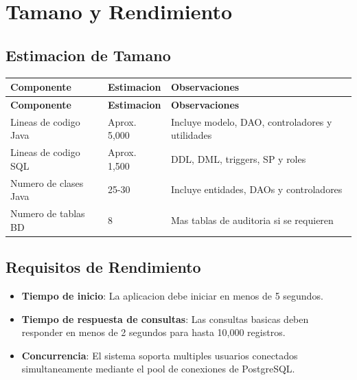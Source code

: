 \documentclass[12pt,a4paper]{article}
\begin{document}
\newpage
\section{Tamano y Rendimiento}

\subsection{Estimacion de Tamano}

\begin{longtable}{|p{5cm}|p{3cm}|p{6cm}|}
\hline
\rowcolor{udgreen!20}
\textbf{Componente} & \textbf{Estimacion} & \textbf{Observaciones} \\
\hline
\endfirsthead
\hline
\rowcolor{udgreen!20}
\textbf{Componente} & \textbf{Estimacion} & \textbf{Observaciones} \\
\hline
\endhead
Lineas de codigo Java & Aprox. 5,000 & Incluye modelo, DAO, controladores y utilidades \\
\hline
Lineas de codigo SQL & Aprox. 1,500 & DDL, DML, triggers, SP y roles \\
\hline
Numero de clases Java & 25-30 & Incluye entidades, DAOs y controladores \\
\hline
Numero de tablas BD & 8 & Mas tablas de auditoria si se requieren \\
\hline
\end{longtable}

\subsection{Requisitos de Rendimiento}

\begin{itemize}
    \item \textbf{Tiempo de inicio}: La aplicacion debe iniciar en menos de 5 segundos.
    \item \textbf{Tiempo de respuesta de consultas}: Las consultas basicas deben responder en menos de 2 segundos para hasta 10,000 registros.
    \item \textbf{Concurrencia}: El sistema soporta multiples usuarios conectados simultaneamente mediante el pool de conexiones de PostgreSQL.
\end{itemize}

\newpage
\end{document}
